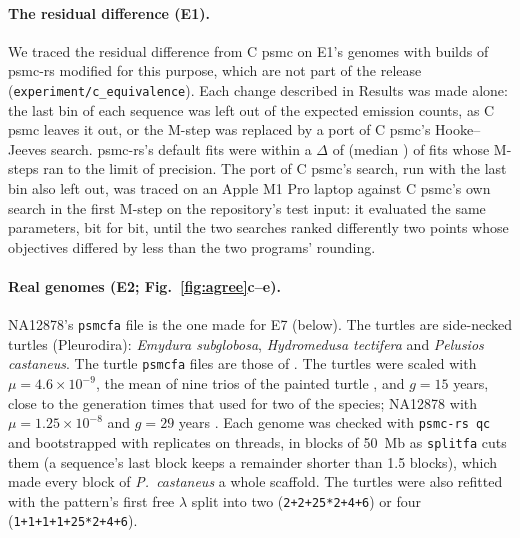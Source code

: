 \documentclass[11pt]{article}
\newcommand{\psmcrs}{psmc-rs}
\newcommand{\opt}[1]{\texttt{#1}}
\begin{document}
\paragraph{The residual difference (E1).} We traced the residual difference from C psmc on E1's \EoneGenomes{} genomes with builds of \psmcrs{} modified for this purpose, which are not part of the release (\texttt{experiment/\allowbreak c\_equivalence}). Each change described in Results was made alone: the last bin of each sequence was left out of the expected emission counts, as C psmc leaves it out, or the M-step was replaced by a port of C psmc's Hooke--Jeeves search. \psmcrs{}'s default fits were within a $\Delta$ of \DiagPrecisionMax{} (median \DiagPrecisionMedian{}) of fits whose M-steps ran to the limit of precision. The port of C psmc's search, run with the last bin also left out, was traced on an Apple M1 Pro laptop against C psmc's own search in the first M-step on the repository's test input: it evaluated the same parameters, bit for bit, until the two searches ranked differently two points whose objectives differed by less than the two programs' rounding.

\paragraph{Real genomes (E2; Fig.~\ref{fig:agree}c--e).} NA12878's \texttt{psmcfa} file is the one made for E7 (below). The \EtwoTurtlesW{} turtles are side-necked turtles (Pleurodira): \textit{Emydura subglobosa}, \textit{Hydromedusa tectifera} and \textit{Pelusios castaneus}. The turtle \texttt{psmcfa} files are those of \citet{hilgers2025}. The turtles were scaled with $\mu=4.6\times10^{-9}$, the mean of nine trios of the painted turtle \citep{bergeron2023}, and $g=15$ years, close to the generation times that \citet{sozzoni2025} used for two of the species; NA12878 with $\mu=1.25\times10^{-8}$ \citep{scally2012} and $g=29$ years \citep{fenner2005}. Each genome was checked with \opt{psmc-rs qc} and bootstrapped with \EtwoBootReps{} replicates on \EtwoBootThreads{} threads, in blocks of 50~Mb as \texttt{splitfa} cuts them (a sequence's last block keeps a remainder shorter than 1.5 blocks), which made every block of \textit{P.~castaneus} a whole scaffold. The turtles were also refitted with the pattern's first free $\lambda$ split into two (\opt{2+2+25*2+4+6}) or four (\opt{1+1+1+1+25*2+4+6}).
\end{document}

